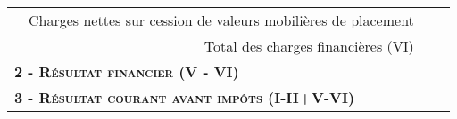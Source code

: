 \begin{table}[h]
\begin{tabular}{|l|p{6cm}|c|c|}
\cline{2-4}                                                                                                                                                                 
                                                                                              & Charges nettes sur cession de valeurs mobilières de placement		        &     &   \\ 
\cline{2-4}                                                                                                                                                                 
                                                                                              & \multicolumn{1}{r|}{Total des charges financières (VI)}                     &     &   \\                                                                                   
\hline                                                                                                                                                                      
 \multicolumn{2}{|l|}{\hspace{1em} \textbf{\textsc{ 2 - Résultat financier (V - VI)}}}     &     & \\
\hline                                                                                                                                                                      
 \multicolumn{2}{|l|}{\hspace{1em} \textbf{\textsc{ 3 - Résultat courant avant impôts (I-II+V-VI)}}}  &  & \\
\hline
\end{tabular}
\label{compteResultatPage1}
\end{table}

